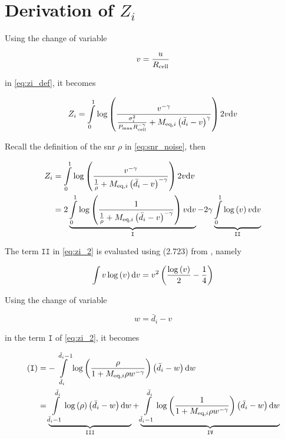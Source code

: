 \chapter{Derivation of $Z_i$}\label{ch:appendix_a}

Using the change of variable

\begin{equation} \label{eq:change_variable_1}
    v = \frac{u}{R_{\text{cell}}}
\end{equation}

\noindent
in \eqref{eq:zi_def}, it becomes

\begin{equation} \label{eq:zi_1}
    Z_i = \int\limits_0^1\log\left(\frac{v^{-\gamma}}{\frac{\sigma_i^2}
    {P_{\max}R_{\text{cell}}^{-\gamma}} + M_{\text{eq},i}\left(\bar{d}_i - v\right)^{\gamma}}
    \right)2v \text{d} v
\end{equation}

Recall the definition of the \gls{snr} $\rho$ in \eqref{eq:snr_noise}, then

\begin{equation} \label{eq:zi_2}
\begin{aligned}
    Z_i &= \int\limits_0^1\log\left(\frac{v^{-\gamma}}{\frac{1}{\rho} + M_{\text{eq},i}
    \left(\bar{d}_i-v\right)^{-\gamma}}\right)2v \text{d} v\\
    &= 2 \underbrace{\int\limits_0^1\log\left(\frac{1}{\frac{1}{\rho}+M_{\text{eq},i}
    \left(\bar{d}_i-v\right)^{-\gamma}}\right)v\text{d} v}_{\mathtt{I}} - 2\gamma
    \underbrace{\int\limits_0^1\log\left(v\right) v\text{d} v}_{\mathtt{II}}
\end{aligned}
\end{equation}

The term $\mathtt{II}$ in \eqref{eq:zi_2} is evaluated using (2.723) from
\cite{gradshteyn00}, namely

\begin{equation} \label{eq:zi_term2}
    \int v\log\left(v\right)\text{d} v = v^2\left(\frac{\log\left(v\right)}{2} -
    \frac{1}{4}\right)
\end{equation}

Using the change of variable

\begin{equation} \label{eq:change_variable_2}
    w = \bar{d}_i - v
\end{equation}

\noindent
in the term $\mathtt{I}$ of \eqref{eq:zi_2}, it becomes

\begin{equation} \label{eq:zi_term1}
\begin{aligned}
    \mathtt{(I)} &= -\int\limits_{\bar{d}_i}^{\bar{d}_i -1}
    \log\left(\frac{\rho}{1 + M_{\text{eq},i}\rho w^{-\gamma}}\right)\left(\bar{d}_i - w
    \right)\text{d} w\\
    &=\underbrace{\int\limits_{\bar{d}_i-1}^{\bar{d}_i}\log\left(\rho\right)
    \left(\bar{d}_i-w\right)\text{d} w}_{\mathtt{III}} +
    \underbrace{\int\limits_{\bar{d}_i-1}^{\bar{d}_i}\log\left(\frac{1}
    {1 + M_{\text{eq},i}\rho w^{-\gamma}}\right)\left(\bar{d}_i - w\right)\text{d} w}_
    {\mathtt{IV}}
\end{aligned}
\end{equation}

